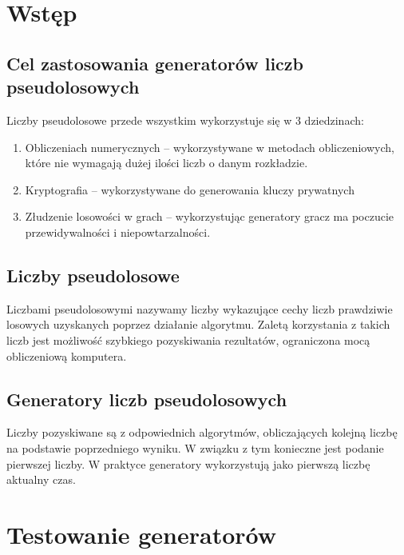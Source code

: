 \documentclass[11pt]{aghdpl}
\author{Żaneta Błaszczuk, Rafał Kozik, Filip Kubicz, Jakub Nowak, Jakub Porębski}
\date{2014}
\begin{document}
\titlepages
\section{Wstęp}
\subsection{Cel zastosowania generatorów liczb pseudolosowych}
Liczby pseudolosowe przede wszystkim wykorzystuje się w 3 dziedzinach:
\begin{enumerate}
\item Obliczeniach numerycznych – wykorzystywane w metodach obliczeniowych, które nie wymagają dużej ilości liczb o danym rozkładzie.
\item Kryptografia – wykorzystywane do generowania kluczy prywatnych
\item Złudzenie losowości w grach – wykorzystując generatory gracz ma poczucie przewidywalności i niepowtarzalności.  
\end{enumerate}
\subsection{Liczby pseudolosowe}
Liczbami pseudolosowymi nazywamy liczby wykazujące cechy liczb prawdziwie losowych uzyskanych poprzez działanie algorytmu. Zaletą korzystania z takich liczb jest możliwość szybkiego pozyskiwania rezultatów, ograniczona mocą obliczeniową komputera.
\subsection{Generatory liczb pseudolosowych}
Liczby pozyskiwane są z odpowiednich algorytmów, obliczających kolejną liczbę na podstawie poprzedniego wyniku. W związku z tym konieczne jest podanie pierwszej liczby. W praktyce generatory wykorzystują jako pierwszą liczbę aktualny czas. 
\section{Testowanie generatorów}
\end{document}
